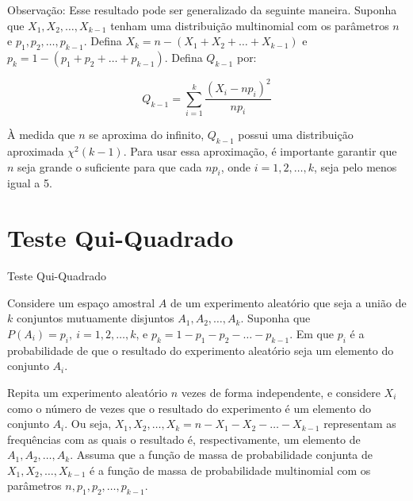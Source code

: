 \documentclass[12pt]{beamer}
\begin{document}
\begin{frame}{}
\begin{block}{Observação:
	}
\justifying
Esse resultado pode ser generalizado da seguinte maneira. Suponha que $X_1, X_2, \ldots, X_{k-1}$ tenham uma distribuição multinomial com os parâmetros $n$ e $p_1, p_2, \ldots, p_{k-1}$. Defina $X_k = n - (X_1 + X_2 + \ldots + X_{k-1})$ e $p_k = 1 - (p_1 + p_2 + \ldots + p_{k-1})$. Defina $Q_{k-1}$ por:

\[
Q_{k-1} = \sum_{i=1}^{k} \frac{(X_i - n p_i)^2}{n p_{i}}
\]

À medida que $n$ se aproxima do infinito, $Q_{k-1}$ possui uma distribuição aproximada $\chi^{2}(k - 1)$. Para usar essa aproximação, é importante garantir que $n$ seja grande o suficiente para que cada $n p_i$, onde $i = 1, 2, \ldots, k$, seja pelo menos igual a 5.
\end{block}
\end{frame}

\section{Teste Qui-Quadrado}
\begin{frame}{Teste Qui-Quadrado}
\begin{block}{}
\justifying
Considere um espaço amostral $A$ de um experimento aleatório que seja a união de $k$ conjuntos mutuamente disjuntos $A_1, A_2, \ldots, A_k$. Suponha que $P(A_i) = p_i,~i = 1, 2, \ldots, k$, e $p_k = 1 - p_1 - p_2 - \ldots - p_{k-1}$. Em que $p_i$ é a probabilidade de que o resultado do experimento aleatório seja um elemento do conjunto $A_i$.
\end{block}
\pause
\begin{block}{}
\justifying
Repita um experimento aleatório $n$ vezes de forma independente, e considere $X_i$ como o número de vezes que o resultado do experimento é um elemento do conjunto $A_i$. Ou seja, $X_1, X_2, \ldots, X_k = n - X_1 - X_2 - \ldots - X_{k-1}$ representam as frequências com as quais o resultado é, respectivamente, um elemento de $A_1, A_2, \ldots, A_k$. Assuma que a função de massa de probabilidade conjunta de $X_1, X_2, \ldots, X_{k-1}$ é a função de massa de probabilidade multinomial com os parâmetros $n, p_1, p_2, \ldots, p_{k-1}$.    
\end{block}
\end{frame}
\end{document}
